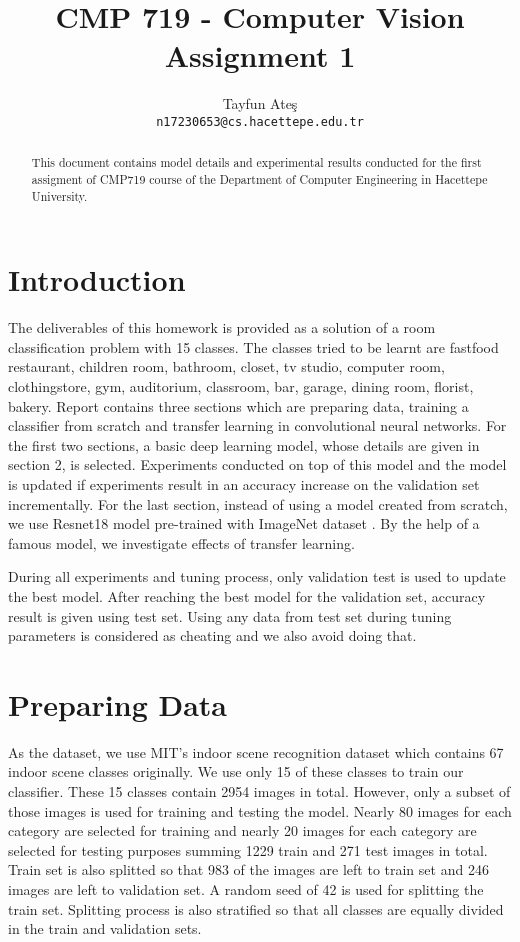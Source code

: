 \documentclass{article}
\title{CMP 719 - Computer Vision Assignment 1}
\author{
  Tayfun Ateş \\
  \texttt{n17230653@cs.hacettepe.edu.tr} \\
}
\begin{document}
\maketitle


\begin{abstract}

This document contains model details and experimental results conducted for the first assigment
of CMP719 course of the Department of Computer Engineering in Hacettepe University.

\end{abstract}

\section{Introduction}

 The deliverables of this homework is provided as a solution of a room classification problem with 15 classes. The classes tried to be learnt are fastfood restaurant, children room, bathroom, closet, tv studio, computer room, clothingstore, gym, auditorium, classroom, bar, garage, dining room, florist, bakery. Report contains three sections which are preparing data, training a classifier from scratch and transfer learning in convolutional neural networks. For the first two sections, a basic deep learning model, whose details are given in section 2, is selected. Experiments conducted on top of this model and the model is updated if experiments result in an accuracy increase on the validation set incrementally. For the last section, instead of using a model created from scratch, we use Resnet18 model \cite{he2016deep} pre-trained with ImageNet dataset  \cite{russakovsky2015imagenet}. By the help of a famous model, we investigate effects of transfer learning. 
 
 During all experiments and tuning process, only validation test is used to update the best model. After reaching the best model for the validation set, accuracy result is given using test set. Using any data from test set during tuning parameters is considered as cheating and we also avoid doing that.

\section{Preparing Data}

As the dataset, we use MIT's indoor scene recognition dataset \cite{quattoni2009recognizing} which contains 67 indoor scene classes originally. We use only 15 of these classes to train our classifier. These 15 classes contain 2954 images in total. However, only a subset of those images is used for training and testing the model. Nearly 80 images for each category are selected for training and nearly 20 images for each category are selected for testing purposes summing 1229 train and 271 test images in total. Train set is also splitted so that 983 of the images are left to train set and 246 images are left to validation set. A random seed of 42 is used for splitting the train set. Splitting process is also stratified so that all classes are equally divided in the train and validation sets.
\end{document}
